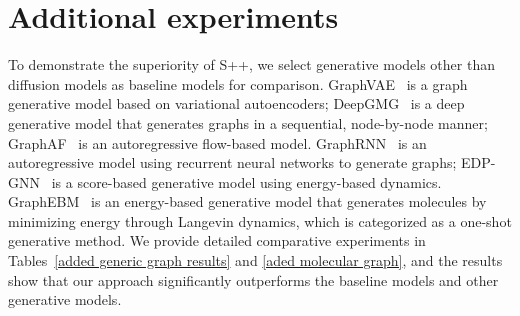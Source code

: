 \documentclass{article}
\begin{document}
\section{Additional experiments}
\label{appendix:E.Added Experiment}
To demonstrate the superiority of S++, we select generative models other than diffusion models as baseline models for comparison. GraphVAE~\citep{simonovsky2018graphvae} is a graph generative model based on variational autoencoders; DeepGMG~\citep{li2018learning} is a deep generative model that generates graphs in a sequential, node-by-node manner; GraphAF~\citep{shi2020graphaf} is an autoregressive flow-based model. GraphRNN~\citep{you2018graphrnn} is an autoregressive model using recurrent neural networks to generate graphs; EDP-GNN~\citep{niu2020permutation} is a score-based generative model using energy-based dynamics. GraphEBM~\citep{liu2021graphebm} is an energy-based generative model that generates molecules by minimizing energy through Langevin dynamics, which is categorized as a one-shot generative method. We provide detailed comparative experiments in Tables~\ref{added generic graph results} and \ref{aded molecular graph}, and the results show that our approach significantly outperforms the baseline models and other generative models.
\end{document}

